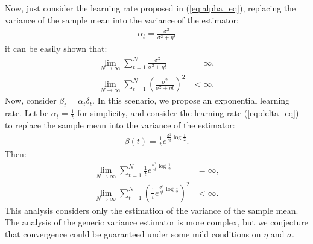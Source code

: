 \documentclass[conference]{IEEEtran}
\begin{document}
Now, just consider the learning rate proposed in (\ref{eq:alpha_eq}), replacing the variance of the sample mean into the variance of the estimator:
\begin{align}\label{eq:alpha_smv}
 \alpha_t=\frac{\sigma^2}{\sigma^2+\eta t}
\end{align}
it can be easily shown that:
\begin{align}
 \lim_{N\rightarrow\infty} \sum_{t=1}^{N}\frac{\sigma^2}{\sigma^2+\eta t} & = \infty, \\
 \lim_{N\rightarrow\infty} \sum_{t=1}^{N}\left(\frac{\sigma^2}{\sigma^2+\eta t}\right)^2 & < \infty.
\end{align}
Now, consider $\beta_t=\alpha_t\delta_t$. In this scenario, we propose an exponential learning rate. Let be $\alpha_t=\frac{1}{t}$ for simplicity, and consider the learning rate (\ref{eq:delta_eq}) to replace the sample mean into the variance of the estimator:
\begin{align}\label{eq:beta_delta_smv}
 \beta(t) = \frac{1}{t}e^{\frac{\sigma^2}{\eta t}\log\frac{1}{2}}.
\end{align}
Then:
\begin{align}
 \lim_{N\rightarrow\infty} \sum_{t=1}^{N}\frac{1}{t}e^{\frac{\sigma^2}{\eta t}\log\frac{1}{2}} & = \infty, \\
 \lim_{N\rightarrow\infty} \sum_{t=1}^{N}\left(\frac{1}{t}e^{\frac{\sigma^2}{\eta t}\log\frac{1}{2}}\right)^2 & < \infty.
\end{align}
This analysis considers only the estimation of the variance of the sample mean. The analysis of the generic variance estimator is more complex, but we conjecture that convergence could be guaranteed under some mild conditions on $\eta$ and $\sigma$.
\end{document}
